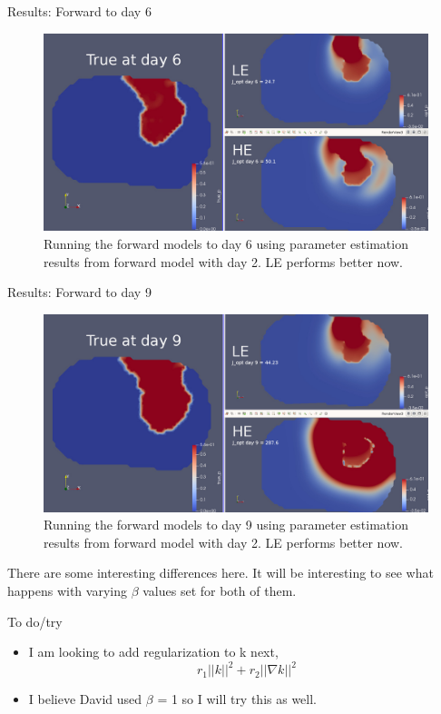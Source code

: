 \documentclass{beamer}
\begin{document}
\begin{frame}{Results: Forward to day 6}
	\begin{figure}
    	\centering
    	\includegraphics[width=\textwidth]{opt_day6.jpg}    	
    	\caption{Running the forward models to day 6 using parameter estimation results from forward model with day 2. LE performs better now.}
    	\end{figure}	
\end{frame}

\begin{frame}{Results: Forward to day 9}
	\begin{figure}
    	\centering
    	\includegraphics[width=\textwidth]{opt_day9.jpg}    	
    	\caption{Running the forward models to day 9 using parameter estimation results from forward model with day 2. LE performs better now.}
    	\end{figure}	
\end{frame}

There are some interesting differences here. It will be interesting to see what happens with varying $\beta$ values set for both of them. 
\begin{frame}{To do/try}
	\begin{minipage}[T][.7\textheight][t]{\textwidth}
		\begin{itemize}
			\item I am looking to add regularization to k next, 
			\[ r_1||k||^2 + r_2||\nabla k||^2\]
			\item I believe David used $\beta$ = 1 so I will try this as well. 
		\end{itemize}
	\end{minipage}
\end{frame}
\end{document}
